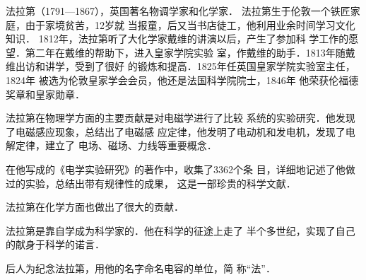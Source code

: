 法拉第（1791—1867），英国著名物调学家和化学家．
法拉第生于伦敦一个铁匠家庭，由于家境贫苦，12岁就
当报童，后又当书店徒工，他利用业余时间学习文化知识．
1812年，法拉第听了大化学家戴维的讲演以后，产生了参加科
学工作的愿望．第二年在戴维的帮助下，进入皇家学院实验
室，作戴维的助手．1813年随戴维出访和讲学，受到了很好
的锻炼和提高．1825年任英国皇家学院实验室主任，1824年
被选为伦敦皇家学会会员，他还是法国科学院院士，1846年
他荣获伦福德奖章和皇家勋章．

法拉第在物理学方面的主要贡献是对电磁学进行了比较
系统的实验研究．他发现了电磁感应现象，总结出了电磁感
应定律，他发明了电动机和发电机，发现了电解定律，建立了
电场、磁场、力线等重要概念．

在他写成的《电学实验研究》的著作中，收集了3362个条
目，详细地记述了他做过的实验，总结出带有规律性的成果，
这是一部珍贵的科学文献．

法拉第在化学方面也做出了很大的贡献．

法拉第是靠自学成为科学家的．他在科学的征途上走了
半个多世纪，实现了自己的献身于科学的诺言．

后人为纪念法拉第，用他的名字命名电容的单位，简
称“法”．


